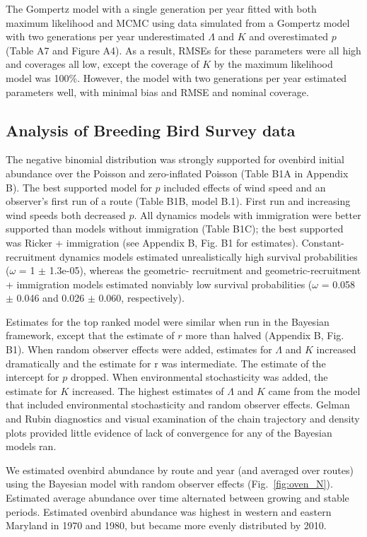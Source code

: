 \documentclass[12pt,english]{article}
\begin{document}
\begin{spacing}{1.9}
\begin{flushleft}
The Gompertz model with a single generation per year fitted with both maximum likelihood and
MCMC using data simulated from a Gompertz model with two generations per year underestimated 
$\Lambda$  and $K$ and 
overestimated $p$ (Table A7 and Figure A4).  As a result, RMSEs for these parameters 
were all high and coverages all low, except the coverage of $K$ by the maximum 
likelihood model was 100\%.  However, the model with two generations per year 
estimated parameters well, with minimal bias and RMSE and nominal coverage.

\subsection*{Analysis of Breeding Bird Survey data}


The negative binomial distribution was strongly supported for ovenbird
initial abundance over the Poisson and zero-inflated Poisson
(Table B1A in Appendix B). 
The best supported model for $p$ included effects of wind speed  
and an observer's first run of a route (Table B1B, model B.1). First run 
and increasing wind speeds both decreased $p$. All dynamics models 
with immigration were better supported than models without immigration 
(Table B1C); the best supported was Ricker + immigration 
(see Appendix B, Fig. B1 for estimates).
Constant-recruitment dynamics models estimated unrealistically high
survival probabilities ($\omega$ = 1 $\pm$ 1.3e-05), whereas 
the geometric- recruitment and geometric-recruitment + immigration
models estimated nonviably low survival probabilities 
($\omega$ =
0.058 $\pm$ 0.046 and 0.026 $\pm$ 0.060, respectively). 

Estimates for the top ranked model 
were similar when
run in the Bayesian framework, except that the estimate of $r$
more than halved (Appendix B, Fig. B1). 
When random observer effects
were added, estimates for $\Lambda$ and $K$ increased dramatically
and the estimate for r was intermediate. The 
estimate of the intercept for $p$ dropped. 
When environmental stochasticity was added, the estimate for $K$ increased. 
The highest estimates of $\Lambda$ and $K$ came 
from the model that included environmental stochasticity and random observer effects. 
Gelman and Rubin diagnostics and visual examination of the chain trajectory and density plots
provided little evidence of lack of convergence for any of the Bayesian models ran.  

We estimated ovenbird abundance by route and year (and averaged over routes) 
using the Bayesian model with random observer effects (Fig.~\ref{fig:oven_N}).  
Estimated average abundance over time alternated between growing and stable periods.  
Estimated ovenbird
abundance was highest in western and eastern Maryland in 1970 and 1980, but became
more evenly distributed by 2010.  


\end{flushleft}
\end{spacing}
\end{document}
